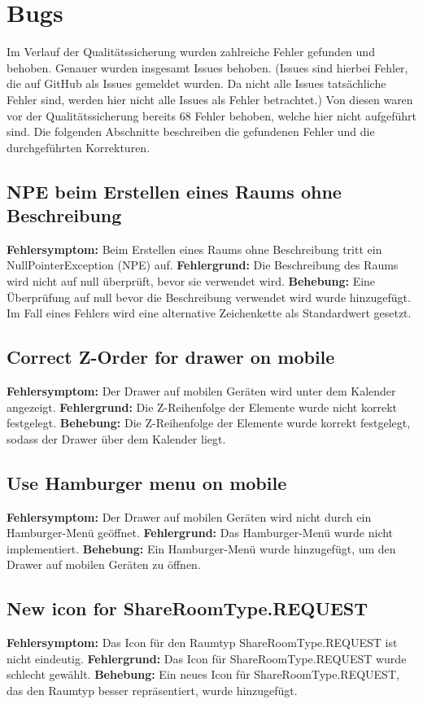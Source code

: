 
\chapter{Bugs}
\label{ch:bugs}

Im Verlauf der Qualitätssicherung wurden zahlreiche Fehler gefunden und behoben.
Genauer wurden insgesamt  Issues behoben. (Issues sind hierbei Fehler, die auf GitHub als Issues gemeldet wurden. Da nicht alle Issues tatsächliche Fehler sind, werden hier nicht alle Issues als Fehler betrachtet.)
Von diesen waren vor der Qualitätssicherung bereits 68 Fehler behoben, welche hier nicht aufgeführt sind.
Die folgenden Abschnitte beschreiben die gefundenen Fehler und die durchgeführten Korrekturen.

\section{NPE beim Erstellen eines Raums ohne Beschreibung}
\textbf{Fehlersymptom:} Beim Erstellen eines Raums ohne Beschreibung tritt ein NullPointerException (NPE) auf.
\textbf{Fehlergrund:} Die Beschreibung des Raums wird nicht auf null überprüft, bevor sie verwendet wird.
\textbf{Behebung:} Eine Überprüfung auf null bevor die Beschreibung verwendet wird wurde hinzugefügt. Im Fall eines Fehlers wird eine alternative Zeichenkette als Standardwert gesetzt.

\section{Correct Z-Order for drawer on mobile}
\textbf{Fehlersymptom:} Der Drawer auf mobilen Geräten wird unter dem Kalender angezeigt.
\textbf{Fehlergrund:} Die Z-Reihenfolge der Elemente wurde nicht korrekt festgelegt.
\textbf{Behebung:} Die Z-Reihenfolge der Elemente wurde korrekt festgelegt, sodass der Drawer über dem Kalender liegt.

\section{Use Hamburger menu on mobile}
\textbf{Fehlersymptom:} Der Drawer auf mobilen Geräten wird nicht durch ein Hamburger-Menü geöffnet.
\textbf{Fehlergrund:} Das Hamburger-Menü wurde nicht implementiert.
\textbf{Behebung:} Ein Hamburger-Menü wurde hinzugefügt, um den Drawer auf mobilen Geräten zu öffnen.

\section{New icon for ShareRoomType.REQUEST}
\textbf{Fehlersymptom:} Das Icon für den Raumtyp ShareRoomType.REQUEST ist nicht eindeutig.
\textbf{Fehlergrund:} Das Icon für ShareRoomType.REQUEST wurde schlecht gewählt.
\textbf{Behebung:} Ein neues Icon für ShareRoomType.REQUEST, das den Raumtyp besser repräsentiert, wurde hinzugefügt.

